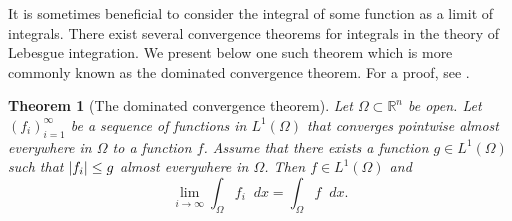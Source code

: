 \documentclass[english, 12pt, a4paper, sci, utf8, a-2b, online]{aaltothesis}
\theoremstyle{definition}
\theoremstyle{plain}
\newtheorem{theorem}{Theorem}[section]
\DeclarePairedDelimiter\abs{\lvert}{\rvert}
\newcommand*\diff{\mathop{}\!d}
\numberwithin{equation}{section}
\begin{document}
It is sometimes beneficial to consider the integral of some function
as a limit of integrals. There exist several convergence theorems
for integrals in the theory of Lebesgue integration.
We present below one such theorem which is more commonly known as the
dominated convergence theorem. For a proof, see
\cite[Theorem 2.24 on p.\ 54]{folland1999}.
\begin{theorem}[The dominated convergence theorem]
    \label{thm:dominated_convergence}
    Let $\Omega \subset \mathbb{R}^n$ be open.
    Let $(f_i)_{i=1}^{\infty}$ be a sequence of functions in $L^1(\Omega)$
    that converges pointwise almost everywhere in $\Omega$ to a function $f$.
    Assume that there exists a function $g \in L^1(\Omega)$ such that
    $\abs{f_i} \leq g$ almost everywhere in $\Omega$. Then
    $f \in L^1(\Omega)$ and
    \begin{equation*}
        \lim_{i \to \infty} \int_{\Omega} f_i \diff x
        = \int_{\Omega} f \diff x.
    \end{equation*}
\end{theorem}
\end{document}
